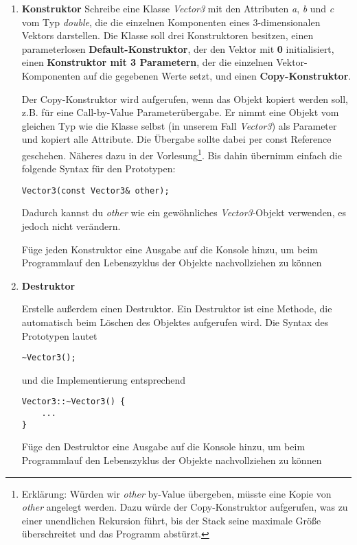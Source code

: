 \begin{enumerate}
\item \textbf{Konstruktor}
Schreibe eine Klasse \emph{Vector3} mit den Attributen \emph{a}, \emph{b} und \emph{c} vom Typ \emph{double}, die die einzelnen Komponenten eines 3-dimensionalen Vektors darstellen.
Die Klasse soll drei Konstruktoren besitzen, einen parameterlosen \textbf{Default-Konstruktor}, der den Vektor mit \textbf{0} initialisiert, einen \textbf{Konstruktor mit 3 Parametern}, der die einzelnen Vektor-Komponenten auf die gegebenen Werte setzt, und einen \textbf{Copy-Konstruktor}.

Der Copy-Konstruktor wird aufgerufen, wenn das Objekt kopiert werden soll, z.B. für eine Call-by-Value Parameterübergabe.
Er nimmt eine Objekt vom gleichen Typ wie die Klasse selbst (in unserem Fall \emph{Vector3}) als Parameter und kopiert alle Attribute.
Die Übergabe sollte dabei per const Reference geschehen.
Näheres dazu in der Vorlesung\footnote{Erklärung: Würden wir \emph{other} by-Value übergeben, müsste eine Kopie von \emph{other} angelegt werden.
	Dazu würde der Copy-Konstruktor aufgerufen, was zu einer unendlichen Rekursion führt, bis der Stack seine maximale Größe überschreitet und das Programm abstürzt.}.
Bis dahin übernimm einfach die folgende Syntax für den Prototypen:
\begin{lstlisting}
Vector3(const Vector3& other);
\end{lstlisting} 

Dadurch kannst du \emph{other} wie ein gewöhnliches \emph{Vector3}-Objekt verwenden, es jedoch nicht verändern.

Füge jeden Konstruktor eine Ausgabe auf die Konsole hinzu, um beim Programmlauf den Lebenszyklus der Objekte nachvollziehen zu können

\item \textbf{Destruktor}

Erstelle außerdem einen Destruktor.
Ein Destruktor ist eine Methode, die automatisch beim Löschen des Objektes aufgerufen wird. Die Syntax des Prototypen lautet
\begin{lstlisting}
~Vector3();
\end{lstlisting} 

und die Implementierung entsprechend
\begin{lstlisting}
Vector3::~Vector3() {
	...
}
\end{lstlisting} 

Füge den Destruktor eine Ausgabe auf die Konsole hinzu, um beim Programmlauf den Lebenszyklus der Objekte nachvollziehen zu können


\end{enumerate}
